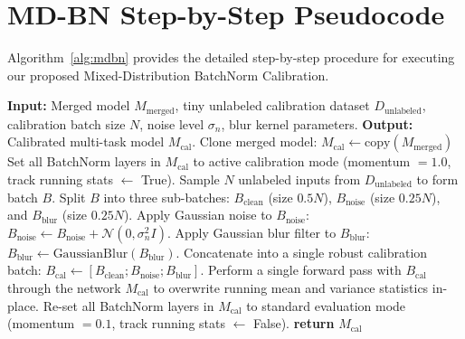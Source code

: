 \documentclass{article}
\theoremstyle{plain}
\theoremstyle{definition}
\theoremstyle{remark}
\begin{document}
\section{MD-BN Step-by-Step Pseudocode}
\label{sec:appendix_pseudocode}
Algorithm~\ref{alg:mdbn} provides the detailed step-by-step procedure for executing our proposed Mixed-Distribution BatchNorm Calibration.

\begin{algorithm}[H]
\caption{Mixed-Distribution BatchNorm Calibration (MD-BN)}
\label{alg:mdbn}
\begin{algorithmic}[1]
\STATE \textbf{Input:} Merged model $M_{\text{merged}}$, tiny unlabeled calibration dataset $D_{\text{unlabeled}}$, calibration batch size $N$, noise level $\sigma_n$, blur kernel parameters.
\STATE \textbf{Output:} Calibrated multi-task model $M_{\text{cal}}$.
\STATE Clone merged model: $M_{\text{cal}} \leftarrow \text{copy}(M_{\text{merged}})$
\STATE Set all BatchNorm layers in $M_{\text{cal}}$ to active calibration mode (momentum $= 1.0$, track running stats $\leftarrow$ True).
\STATE Sample $N$ unlabeled inputs from $D_{\text{unlabeled}}$ to form batch $B$.
\STATE Split $B$ into three sub-batches: $B_{\text{clean}}$ (size $0.5N$), $B_{\text{noise}}$ (size $0.25N$), and $B_{\text{blur}}$ (size $0.25N$).
\STATE Apply Gaussian noise to $B_{\text{noise}}$: $B_{\text{noise}} \leftarrow B_{\text{noise}} + \mathcal{N}(0, \sigma_n^2 I)$.
\STATE Apply Gaussian blur filter to $B_{\text{blur}}$: $B_{\text{blur}} \leftarrow \text{GaussianBlur}(B_{\text{blur}})$.
\STATE Concatenate into a single robust calibration batch: $B_{\text{cal}} \leftarrow [B_{\text{clean}}; B_{\text{noise}}; B_{\text{blur}}]$.
\STATE Perform a single forward pass with $B_{\text{cal}}$ through the network $M_{\text{cal}}$ to overwrite running mean and variance statistics in-place.
\STATE Re-set all BatchNorm layers in $M_{\text{cal}}$ to standard evaluation mode (momentum $= 0.1$, track running stats $\leftarrow$ False).
\STATE \textbf{return} $M_{\text{cal}}$
\end{algorithmic}
\end{algorithm}
\end{document}
